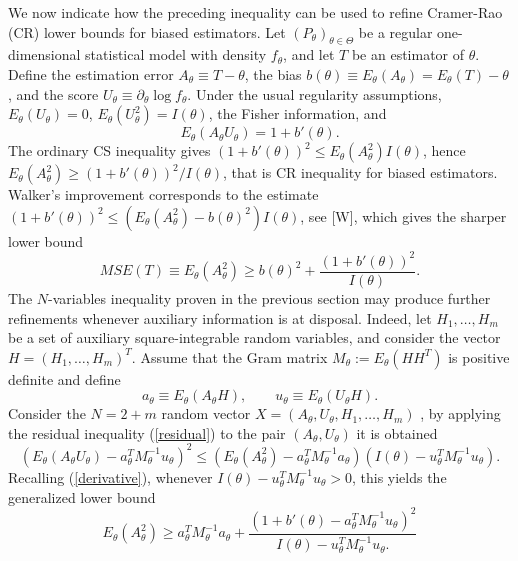 \documentclass[11pt]{article}
\begin{document}
We now indicate how the preceding inequality can be used to refine Cramer-Rao (CR) lower bounds for biased estimators. Let $(P_\theta)_{\theta\in\Theta}$ be a regular one-dimensional statistical model with density $f_\theta$, and let $T$ be an estimator of $\theta$. Define the estimation error $A_\theta \equiv T-\theta$, the bias $b(\theta)\equiv E_\theta(A_\theta)=E_\theta(T)-\theta$, and the score $U_\theta \equiv \partial_\theta\log f_\theta$. Under the usual regularity assumptions, $E_\theta(U_\theta)=0$, $E_\theta(U_\theta^2)=I(\theta)$, the Fisher information, and
\begin{equation}\label{derivative}
E_\theta(A_\theta U_\theta)=1+b'(\theta).
\end{equation}
The ordinary CS inequality gives $\left(1+b'(\theta)\right)^2\leq E_\theta(A_\theta^2)I(\theta)$,
hence $E_\theta(A_\theta^2)\geq (1+b'(\theta))^2/I(\theta)$, that is CR inequality for biased estimators. Walker's improvement corresponds to the estimate $\left(1+b'(\theta)\right)^2\leq\left(E_\theta(A_\theta^2)-b(\theta)^2\right)I(\theta)$, see [W], which gives the sharper lower bound
\begin{equation}\label{Walker}
MSE(T)\equiv E_\theta(A_\theta^2)
\geq
b(\theta)^2+
\frac{\left(1+b'(\theta)\right)^2}{I(\theta)}.
\end{equation}
The $N$-variables inequality proven in the previous section may produce further refinements whenever auxiliary information is at disposal. Indeed, let $H_1,\dots,H_m$ be a set of auxiliary square-integrable random variables, and consider the vector $H=(H_1,\dots,H_m)^T$. Assume that the Gram matrix $M_\theta:=E_\theta(HH^T)$ is positive definite and define
\begin{equation}
a_\theta \equiv E_\theta(A_\theta H),
\qquad
u_\theta \equiv E_\theta(U_\theta H).
\end{equation}
Consider the $N=2+m$ random vector $X=(A_\theta,U_\theta,H_1,\ldots,H_m)$ , by applying the residual inequality (\ref{residual}) to the pair $(A_\theta,U_\theta)$ it is obtained
$$
\left(
E_\theta(A_\theta U_\theta)-a_\theta^TM_\theta^{-1}u_\theta
\right)^2
\leq
\left(
E_\theta(A_\theta^2)-a_\theta^TM_\theta^{-1}a_\theta
\right)
\left(
I(\theta)-u_\theta^TM_\theta^{-1}u_\theta
\right).
$$
Recalling  (\ref{derivative}), whenever $I(\theta)-u_\theta^TM_\theta^{-1}u_\theta>0$, this yields the generalized lower bound
\begin{equation}\label{general_CR}
E_\theta(A_\theta^2)
\geq
a_\theta^TM_\theta^{-1}a_\theta
+
\frac{
\left(
1+b'(\theta)-a_\theta^TM_\theta^{-1}u_\theta
\right)^2
}{
I(\theta)-u_\theta^TM_\theta^{-1}u_\theta.
}
\end{equation}
\end{document}
